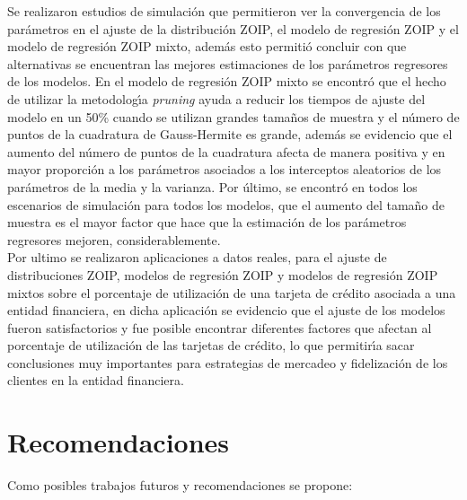 Se realizaron estudios de simulaci\'{o}n que permitieron ver la convergencia de los par\'{a}metros en el ajuste de la distribuci\'{o}n ZOIP, el modelo de regresi\'{o}n ZOIP y el modelo de regresi\'{o}n ZOIP mixto, adem\'{a}s esto permiti\'{o} concluir con que alternativas se encuentran las mejores estimaciones de los par\'{a}metros regresores de los modelos. En el modelo de regresi\'{o}n ZOIP mixto se encontr\'{o} que el hecho de utilizar la metodolog\'{\i}a \textit{pruning} ayuda a reducir los tiempos de ajuste del modelo en un 50\% cuando se utilizan grandes tama\~{n}os de muestra y el n\'{u}mero de puntos de la cuadratura de Gauss-Hermite es grande, adem\'{a}s se evidencio que el aumento del n\'{u}mero de puntos de la cuadratura afecta de manera positiva y en mayor proporci\'{o}n a los par\'{a}metros asociados a los interceptos aleatorios de los par\'{a}metros de la media y la varianza. Por \'{u}ltimo, se encontr\'{o} en todos los escenarios de simulaci\'{o}n para todos los modelos, que el aumento del tama\~{n}o de muestra es el mayor factor que hace que la estimaci\'{o}n de los par\'{a}metros regresores mejoren, considerablemente.\\

Por ultimo se realizaron aplicaciones a datos reales, para el ajuste de distribuciones ZOIP, modelos de regresi\'{o}n ZOIP y modelos de regresi\'{o}n ZOIP mixtos sobre el porcentaje de utilizaci\'{o}n de una tarjeta de cr\'{e}dito asociada a una entidad financiera, en dicha aplicaci\'{o}n se evidencio que el ajuste de los modelos fueron satisfactorios y  fue posible encontrar diferentes factores que afectan al porcentaje de utilizaci\'{o}n de las tarjetas de cr\'{e}dito, lo que permitir\'{\i}a sacar conclusiones muy importantes para estrategias de mercadeo y fidelizaci\'{o}n de los clientes en la entidad financiera.


\section{Recomendaciones}

Como posibles trabajos futuros y recomendaciones se propone:

